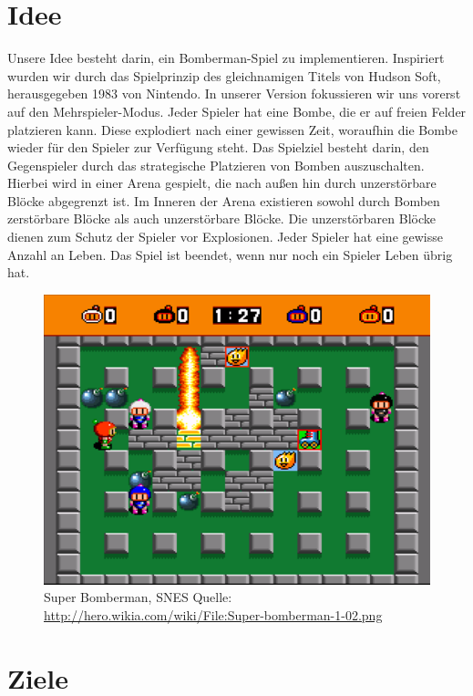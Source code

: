 \documentclass[parskip=full]{scrartcl}
\begin{document}
	\section{Idee}
		Unsere Idee besteht darin, ein Bomberman-Spiel zu implementieren. Inspiriert wurden wir durch das Spielprinzip des gleichnamigen Titels von Hudson Soft, herausgegeben 1983 von Nintendo. In unserer Version fokussieren wir uns vorerst auf den Mehrspieler-Modus. 
		Jeder Spieler hat eine Bombe, die er auf freien Felder platzieren kann. Diese explodiert nach einer gewissen Zeit, woraufhin die Bombe wieder für den Spieler zur Verfügung steht.
		Das Spielziel besteht darin, den Gegenspieler durch das strategische Platzieren von Bomben auszuschalten. \newline
		Hierbei wird in einer Arena gespielt, die nach außen hin durch unzerstörbare Blöcke abgegrenzt ist. Im Inneren der Arena existieren sowohl durch Bomben zerstörbare Blöcke als auch unzerstörbare Blöcke. Die unzerstörbaren Blöcke dienen zum Schutz der Spieler vor Explosionen. \newline
		Jeder Spieler hat eine gewisse Anzahl an Leben. Das Spiel ist beendet, wenn nur noch ein Spieler Leben übrig hat.
		\begin{figure}[H]
			\centering
			\includegraphics[scale=0.6]{../bomberman.png}
			\centering
			\caption*{Super Bomberman, SNES \newline Quelle: \url{http://hero.wikia.com/wiki/File:Super-bomberman-1-02.png} }
		\end{figure}
		
	
	\section{Ziele}
\end{document}
